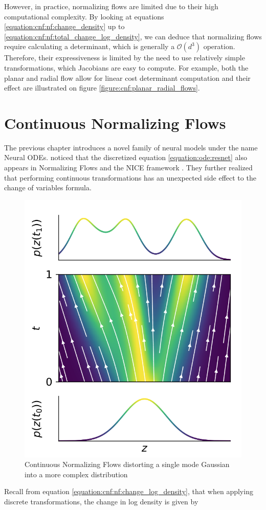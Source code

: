 However, in practice, normalizing flows are limited due to their high computational complexity. By looking at equations \ref{equation:cnf:nf:change_density} up to \ref{equation:cnf:nf:total_change_log_density}, we can deduce that normalizing flows require calculating a determinant, which is generally a $ \mathcal{O}(d^3) $ operation. Therefore, their expressiveness is limited by the need to use relatively simple transformations, which Jacobians are easy to compute. For example, both the planar and radial flow allow for linear cost determinant computation and their effect are illustrated on figure \ref{figure:cnf:planar_radial_flows}.

\section{Continuous Normalizing Flows}
\label{section:cnf:cnf}

The previous chapter introduces a novel family of neural models under the name Neural ODEs. \citet{chen2018neural} noticed that the discretized equation \ref{equation:ode:resnet} also appears in Normalizing Flows \citep{rezende2015variational} and the NICE framework \citep{dinh2014nice}. They further realized that performing continuous transformations has an unexpected side effect to the change of variables formula.

\begin{figure}[ht]
      \centering
      \includegraphics[width=0.5\columnwidth]{figures/cnf_transformations.png}
      \caption{Continuous Normalizing Flows distorting a single mode Gaussian into a more complex distribution \citep{grathwohl2018ffjord}}
      \label{figure:cnf:cnf_transformations}
\end{figure}

Recall from equation \ref{equation:cnf:nf:change_log_density}, that when applying discrete transformations, the change in log density is given by

